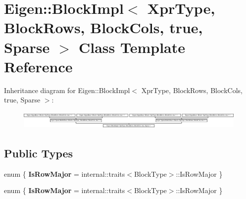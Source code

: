 \hypertarget{class_eigen_1_1_block_impl_3_01_xpr_type_00_01_block_rows_00_01_block_cols_00_01true_00_01_sparse_01_4}{}\section{Eigen\+:\+:Block\+Impl$<$ Xpr\+Type, Block\+Rows, Block\+Cols, true, Sparse $>$ Class Template Reference}
\label{class_eigen_1_1_block_impl_3_01_xpr_type_00_01_block_rows_00_01_block_cols_00_01true_00_01_sparse_01_4}
Inheritance diagram for Eigen\+:\+:Block\+Impl$<$ Xpr\+Type, Block\+Rows, Block\+Cols, true, Sparse $>$\+:\begin{figure}[H]
\begin{center}
\leavevmode
\includegraphics[height=0.923077cm]{class_eigen_1_1_block_impl_3_01_xpr_type_00_01_block_rows_00_01_block_cols_00_01true_00_01_sparse_01_4}
\end{center}
\end{figure}
\subsection*{Public Types}
\begin{DoxyCompactItemize}
\item 
\mbox{\label{class_eigen_1_1_block_impl_3_01_xpr_type_00_01_block_rows_00_01_block_cols_00_01true_00_01_sparse_01_4_a24a0716bfd46d0363991ac1ab1c32206}} 
enum \{ {\bfseries Is\+Row\+Major} = internal\+:\+:traits$<$Block\+Type$>$\+:\+:Is\+Row\+Major
 \}
\item 
\mbox{\label{class_eigen_1_1_block_impl_3_01_xpr_type_00_01_block_rows_00_01_block_cols_00_01true_00_01_sparse_01_4_a91e1ed0d5e13fd3a5d3d2addf407931f}} 
enum \{ {\bfseries Is\+Row\+Major} = internal\+:\+:traits$<$Block\+Type$>$\+:\+:Is\+Row\+Major
 \}
\end{DoxyCompactItemize}
